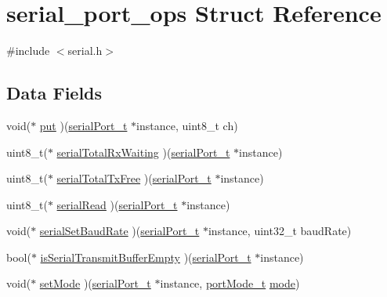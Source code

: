\hypertarget{structserial__port__ops}{\section{serial\+\_\+port\+\_\+ops Struct Reference}
\label{structserial__port__ops}
}


{\ttfamily \#include $<$serial.\+h$>$}

\subsection*{Data Fields}
\begin{DoxyCompactItemize}
\item 
void($\ast$ \hyperlink{structserial__port__ops_afc535b2947ced3170a79a4f5883833dc}{put} )(\hyperlink{drivers_2serial_8h_a64a5e2f04e1a908fbb1b3b165f88e0ef}{serial\+Port\+\_\+t} $\ast$instance, uint8\+\_\+t ch)
\item 
uint8\+\_\+t($\ast$ \hyperlink{structserial__port__ops_ab99d48d2e07a90806c11288003176eac}{serial\+Total\+Rx\+Waiting} )(\hyperlink{drivers_2serial_8h_a64a5e2f04e1a908fbb1b3b165f88e0ef}{serial\+Port\+\_\+t} $\ast$instance)
\item 
uint8\+\_\+t($\ast$ \hyperlink{structserial__port__ops_adc846306b3e2efba89c5c70d3f574780}{serial\+Total\+Tx\+Free} )(\hyperlink{drivers_2serial_8h_a64a5e2f04e1a908fbb1b3b165f88e0ef}{serial\+Port\+\_\+t} $\ast$instance)
\item 
uint8\+\_\+t($\ast$ \hyperlink{structserial__port__ops_aaf3d862270d8102947788db2cafb3dc8}{serial\+Read} )(\hyperlink{drivers_2serial_8h_a64a5e2f04e1a908fbb1b3b165f88e0ef}{serial\+Port\+\_\+t} $\ast$instance)
\item 
void($\ast$ \hyperlink{structserial__port__ops_aff9a30e984333439de55b626e56ba8fe}{serial\+Set\+Baud\+Rate} )(\hyperlink{drivers_2serial_8h_a64a5e2f04e1a908fbb1b3b165f88e0ef}{serial\+Port\+\_\+t} $\ast$instance, uint32\+\_\+t baud\+Rate)
\item 
bool($\ast$ \hyperlink{structserial__port__ops_a006fe583d610a68d0d8e74d142dd396e}{is\+Serial\+Transmit\+Buffer\+Empty} )(\hyperlink{drivers_2serial_8h_a64a5e2f04e1a908fbb1b3b165f88e0ef}{serial\+Port\+\_\+t} $\ast$instance)
\item 
void($\ast$ \hyperlink{structserial__port__ops_aba70bea039e29356974593d1d54ab73f}{set\+Mode} )(\hyperlink{drivers_2serial_8h_a64a5e2f04e1a908fbb1b3b165f88e0ef}{serial\+Port\+\_\+t} $\ast$instance, \hyperlink{drivers_2serial_8h_ae93363f27f1a41ae63f3bb5b8170e661}{port\+Mode\+\_\+t} \hyperlink{config_2tilt_8h_a37e90f5e3bd99fac2021fb3a326607d4}{mode})

\end{DoxyCompactItemize}
